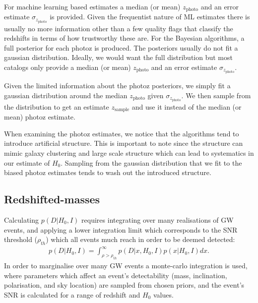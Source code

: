 \documentclass[a4paper,10pt]{article}
\begin{document}
For machine learning based estimates a median (or mean) $z_\text{photo}$ and an error estimate $\sigma_{z_\text{photo}}$ is provided. Given the frequentist nature of ML estimates there is usually no more information other than a few quality flags that classify the redshifts in terms of how trustworthy these are. 
For the Bayesian algorithms, a full posterior for each photoz is produced. The posteriors usually do not fit a gaussian distribution. Ideally, we would want the full distribution but most catalogs only provide a median (or mean) $z_\text{photo}$ and an error estimate $\sigma_{z_\text{photo}}$.

Given the limited information about the photoz posteriors, we simply fit a gaussian distribution around the median $z_\text{photo}$ given $\sigma_{z_\text{photo}}$. We then sample from the distribution to get an estimate $z_\text{sample}$ and use it instead of the median (or mean) photoz estimate.

When examining the photoz estimates, we notice that the algorithms tend to introduce artificial structure. This is important to note since the structure can mimic galaxy clustering and large scale structure which can lead to systematics in our estimate of $H_0$. Sampling from the gaussian distribution that we fit to the biased photoz estimates tends to wash out the introduced structure.

\subsection{Redshifted-masses}
Calculating $p(D|H_0,I)$ requires integrating over many realisations of GW events, and applying a lower integration limit which corresponds to the SNR threshold ($\rho_{th}$) which all events much reach in order to be deemed detected:
\begin{equation}
\begin{aligned}
p(D|H_0,I) = \int_{\rho>\rho_{th}}^\infty p(D|x,H_0,I)p(x|H_0,I)dx.
\end{aligned}
\end{equation}
In order to marginalise over many GW events a monte-carlo integration is used, where parameters which affect an event's detectability (mass, inclination, polarisation, and sky location) are sampled from chosen priors, and the event's SNR is calculated for a range of redshift and $H_0$ values.
\end{document}
